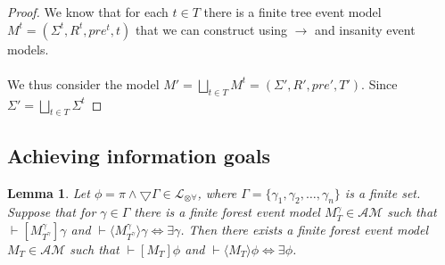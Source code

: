 \documentclass[12pt, a4paper, titlepage]{scrartcl}
\newtheorem{lemma}{Lemma}[section]
\numberwithin{equation}{section}
\newcommand{\cover}{\bigtriangledown}
\newcommand{\lang}{\mathcal{L}}
\newcommand{\langArbAct}{\lang_{\otimes\forall}}
\begin{document}
\begin{proof}
We know that for each $t \in T$ there is a finite tree event model $M^t = (\Sigma^t, R^t, pre^t, t)$
that we can construct using $\to$ and insanity event models.\\
\\
We thus consider the model $M' = \bigsqcup_{t \in T} M^t = (\Sigma', R', pre', T')$.
Since $\Sigma' = \bigsqcup_{t \in T} \Sigma^t$
\end{proof}

\subsection{Achieving information goals}

\begin{lemma}
Let $\phi = \pi \land \cover \Gamma \in \langArbAct$, where $\Gamma = \{\gamma_1, \gamma_2, \ldots,
		\gamma_n\}$ is a finite set.
Suppose that for $\gamma \in \Gamma$ there is a finite forest event model $M^\gamma_T \in \mathcal{AM}$ such that
$\vdash [M^\gamma_{T^\gamma}] \gamma$ and $\vdash \langle M^\gamma_{T^\gamma} \rangle \gamma \iff \exists \gamma$.
Then there exists a finite forest event model $M_T \in \mathcal{AM}$ such that $\vdash [M_T]\phi$ and
$\vdash \langle M_T \rangle \phi \iff \exists \phi$.
\end{lemma}
\end{document}
